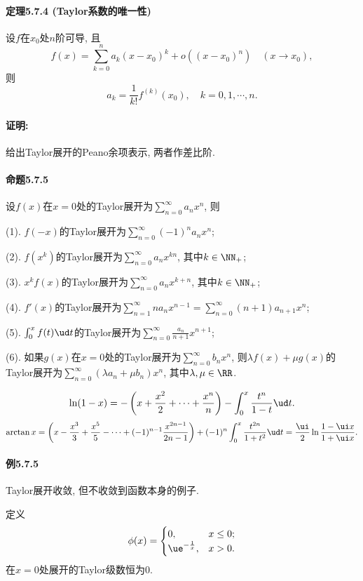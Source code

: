 \paragraph{定理5.7.4 (Taylor系数的唯一性)}

设$f$在$x_{0}$处$n$阶可导, 且
\[
f(x)=\sum_{k=0}^{n}a_{k}(x-x_{0})^{k}+o((x-x_{0})^{n})\quad(x\to x_{0}),
\]
则
\[
a_{k}=\frac{1}{k!}f^{(k)}(x_{0}),\quad k=0,1,\cdots,n.
\]


\paragraph{证明:}

给出Taylor展开的Peano余项表示, 两者作差比阶.

\paragraph{命题5.7.5}

设$f(x)$在$x=0$处的Taylor展开为$\sum_{n=0}^{\infty}a_{n}x^{n}$, 则

(1). $f(-x)$的Taylor展开为$\sum_{n=0}^{\infty}(-1)^{n}a_{n}x^{n}$;

(2). $f(x^{k})$的Taylor展开为$\sum_{n=0}^{\infty}a_{n}x^{kn}$, 其中$k\in\NN_{+}$;

(3). $x^{k}f(x)$的Taylor展开为$\sum_{n=0}^{\infty}a_{n}x^{k+n}$, 其中$k\in\NN_{+}$;

(4). $f'(x)$的Taylor展开为$\sum_{n=1}^{\infty}na_{n}x^{n-1}=\sum_{n=0}^{\infty}(n+1)a_{n+1}x^{n}$;

(5). $\int_{0}^{x}f(t)\ud t$的Taylor展开为$\sum_{n=0}^{\infty}\frac{a_{n}}{n+1}x^{n+1}$;

(6). 如果$g(x)$在$x=0$处的Taylor展开为$\sum_{n=0}^{\infty}b_{n}x^{n}$,
则$\lambda f(x)+\mu g(x)$的Taylor展开为$\sum_{n=0}^{\infty}(\lambda a_{n}+\mu b_{n})x^{n}$,
其中$\lambda,\mu\in\RR$.

\[
\ln(1-x)=-\left(x+\frac{x^{2}}{2}+\cdots+\frac{x^{n}}{n}\right)-\int_{0}^{x}\frac{t^{n}}{1-t}\ud t.
\]
\[
\arctan x=\left(x-\frac{x^{3}}{3}+\frac{x^{5}}{5}-\cdots+(-1)^{n-1}\frac{x^{2n-1}}{2n-1}\right)+(-1)^{n}\int_{0}^{x}\frac{t^{2n}}{1+t^{2}}\ud t=\frac{\ui}{2}\ln\frac{1-\ui x}{1+\ui x}.
\]


\paragraph{例5.7.5 }

Taylor展开收敛, 但不收敛到函数本身的例子.

定义
\[
\phi(x)=\begin{cases}
	0, & x\le0;\\
	\ue^{-\frac{1}{x}}, & x>0.
\end{cases}
\]
在$x=0$处展开的Taylor级数恒为$0$.

